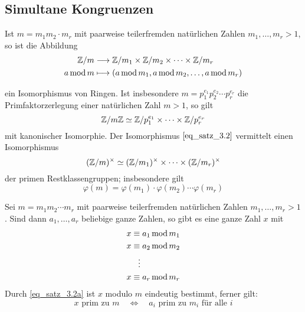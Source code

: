 \subsection{Simultane Kongruenzen}
\begin{satz} \label{satz_3.2}
	Ist $m = m_1 m_2 \cdot m_r$ mit paarweise teilerfremden natürlichen Zahlen $m_1,\dots,m_r > 1$, so ist die Abbildung 
	\begin{equation}
	\begin{aligned}
		\mathbb{Z}/m &\longrightarrow \mathbb{Z}/m_1 \times \mathbb{Z}/m_2 \times \cdots \times \mathbb{Z}/m_r \\
		a \operatorname{mod} m &\longmapsto (a \operatorname{mod} m_1, a \operatorname{mod} m_2, \dots, a \operatorname{mod} m_r)	\label{eq_satz_3.2}
	\end{aligned}
	\end{equation}
	
	ein Isomorphismus von Ringen. Ist insbesondere $m = p_1^{e_1} p_2^{e_2} \cdots p_r^{e_r}$ die Primfaktorzerlegung einer natürlichen Zahl $m > 1$, so gilt
	\[ \mathbb{Z}/m\mathbb{Z} \simeq \mathbb{Z}/p_1^{e_1} \times \cdots \times \mathbb{Z}/p_r^{e_r} \]
	mit kanonischer Isomorphie. Der Isomorphismus $\eqref{eq_satz_3.2}$ vermittelt einen Isomorphismus
	\[ (\mathbb{Z}/m)^\times \simeq (\mathbb{Z}/m_1)^\times \times \dots \times (\mathbb{Z}/m_r)^\times \]
	der primen Restklassengruppen; insbesondere gilt
	\[ \varphi(m) = \varphi(m_1) \cdot \varphi(m_2) \cdots \varphi(m_r) \]
\end{satz}

\setcounter{countsatz}{1}
\begin{satz} \label{satz_3.2a}
	Sei $m = m_1m_2 \cdots m_r$ mit paarweise teilerfremden natürlichen Zahlen $m_1,\dots,m_r > 1$. Sind dann $a_1,\dots,a_r$ beliebige ganze Zahlen, so gibt es eine ganze Zahl $x$ mit  
	\begin{equation}
	\begin{aligned}
		x &\equiv a_1 \operatorname{mod} m_1 \\
		x &\equiv a_2 \operatorname{mod} m_2 \\
		&\ \ \vdots \\
		x &\equiv a_r \operatorname{mod} m_r \label{eq_satz_3.2a}
	\end{aligned}
	\end{equation}
	Durch \eqref{eq_satz_3.2a} ist $x$ modulo $m$ eindeutig bestimmt, ferner gilt:
	\[ x \text{ prim zu } m \quad \Leftrightarrow \quad a_i \text{ prim zu } m_i \text{ für alle } i \]
\end{satz}

